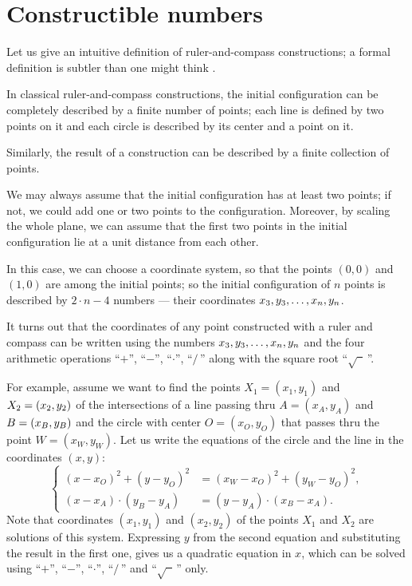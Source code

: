 %

\section{Constructible numbers}

Let us give an intuitive definition of ruler-and-compass constructions; a formal definition is subtler than one might think \cite{engeler}.

In classical ruler-and-compass constructions, the initial configuration can be completely described by a finite number of points;
each line is defined by two points on it and each circle is described by its center and a point on it.

Similarly, the result of a construction can be described by a finite collection of points.

We may always assume that the initial configuration has at least two points;
if not, we could add one or two points to the configuration.
Moreover, by scaling the whole plane, we can assume that the first two points in the initial configuration lie at a unit distance from each other.

In this case, we can choose a  coordinate system, 
so that the points $(0,0)$ and $(1,0)$ are among the initial points;
so the initial configuration of $n$ points is described by 
$2\cdot n-4$ numbers --- their coordinates $x_3,y_3,\dots,x_n,y_n$. 

\medskip

It turns out that the coordinates of any point constructed with a ruler and compass
can be written using the numbers $x_3,y_3,\dots,x_n,y_n$ and the four arithmetic operations ``$+$'', ``$-$'', ``$\cdot$'', ``$/\,$''
along with the square root ``$\sqrt{\phantom{a}}\,$''.

For example, assume we want to find the points $X_1=(x_1,y_1)$ and $X_2=(x_2,y_2)$ of the intersections of 
a line passing thru $A=(x_A,y_A)$ and $B=(x_B,y_B)$ and
the circle with center $O=(x_O,y_O)$ that passes thru the point $W=(x_W,y_W)$.
Let us write the equations of the circle and the line in the coordinates $(x,y)$:
$$
\left\{
\begin{aligned}
(x-x_O)^2+(y-y_O)^2&=(x_W-x_O)^2+(y_W-y_O)^2,
\\
(x-x_A)\cdot(y_B-y_A)&=(y-y_A)\cdot(x_B-x_A).
\end{aligned}
\right.
$$
Note that coordinates $(x_1,y_1)$ and $(x_2,y_2)$ of the points $X_1$ and $X_2$ are solutions of this system.
Expressing $y$ from the second equation and substituting the result in the first one, gives us a quadratic equation in $x$, 
which can be solved using ``$+$'', ``$-$'', ``$\cdot$'', ``$/\,$''
and  ``$\sqrt{\phantom{a}}\,$'' only.


